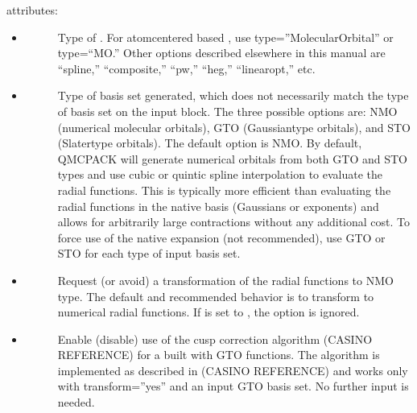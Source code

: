 \documentclass[letterpaper,10pt,english]{sphinxmanual}
\begin{document}
 attributes:
\begin{itemize}
\item {} \begin{description}
\item[{}] \leavevmode
Type of . For atom\sphinxhyphen{}centered based , use type=”MolecularOrbital” or type=“MO.”
Other options described elsewhere in this manual are “spline,”
“composite,” “pw,” “heg,” “linearopt,” etc.

\end{description}

\item {} \begin{description}
\item[{}] \leavevmode
Type of basis set generated, which does not necessarily match the type of basis set on the input block. The three possible options are: NMO (numerical molecular orbitals), GTO (Gaussian\sphinxhyphen{}type orbitals), and STO (Slater\sphinxhyphen{}type orbitals). The default option is NMO. By default, QMCPACK will generate numerical orbitals from both GTO and STO types and use cubic or quintic spline interpolation to evaluate the radial functions. This is typically more efficient than evaluating the radial functions in the native basis (Gaussians or exponents) and allows for arbitrarily large contractions without any additional cost. To force use of the native expansion (not recommended), use GTO or STO for each type of input basis set.

\end{description}

\item {} \begin{description}
\item[{}] \leavevmode
Request (or avoid) a transformation of the radial functions to NMO type. The default and recommended behavior is to transform to numerical radial functions. If  is set to , the option  is ignored.

\end{description}

\item {} \begin{description}
\item[{}] \leavevmode
Enable (disable) use of the cusp correction algorithm (CASINO REFERENCE) for a  built with GTO functions. The algorithm is implemented as described in (CASINO REFERENCE) and works only with transform=”yes” and an input GTO basis set. No further input is needed.

\end{description}

\end{itemize}
\end{document}
